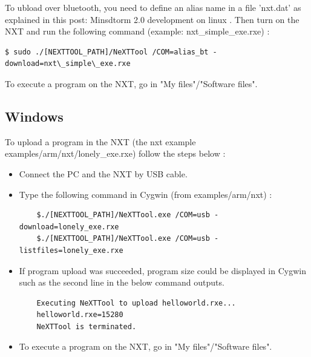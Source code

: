 To ubload over bluetooth, you need to define an alias name in a file 'nxt.dat' as explained in this post: Minsdtorm 2.0 development on linux . Then turn on the NXT and run the following command (example: nxt\_simple\_exe.rxe) :
\begin{verbatim}
$ sudo ./[NEXTTOOL_PATH]/NeXTTool /COM=alias_bt -download=nxt\_simple\_exe.rxe
\end{verbatim}

To execute a program on the NXT, go in "My files"/"Software files".

\subsection{Windows}
To upload a program in the NXT (the nxt example examples/arm/nxt/lonely\_exe.rxe) follow the steps below :
\begin{itemize}
\item Connect the PC and the NXT by USB cable.
\item Type the following command in Cygwin (from examples/arm/nxt) :
	\begin{verbatim}
	$./[NEXTTOOL_PATH]/NeXTTool.exe /COM=usb -download=lonely_exe.rxe
	$./[NEXTTOOL_PATH]/NeXTTool.exe /COM=usb -listfiles=lonely_exe.rxe
	\end{verbatim}
\item If program upload was succeeded, program size could be displayed in Cygwin such as the second line in the below command outputs. 
	\begin{verbatim}
	Executing NeXTTool to upload helloworld.rxe...
	helloworld.rxe=15280
	NeXTTool is terminated.
	\end{verbatim}
\item To execute a program on the NXT, go in "My files"/"Software files".
\end{itemize}

%

